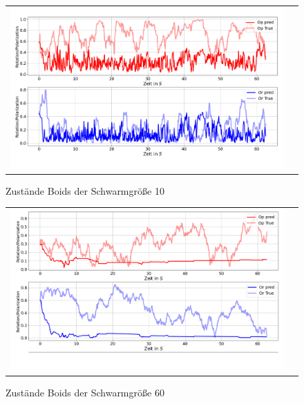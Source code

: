 \begin{appendices}
\begin{figure}[H]
\centering
\begin{tabular}{cc}
\includegraphics[width=1.0\textwidth]{figures/Anhang/Boids_10.png} 
\end{tabular}
\caption{Zustände Boids der Schwarmgröße 10 }
\end{figure}

\begin{figure}[H]
\centering
\begin{tabular}{cc}
\includegraphics[width=1.0\textwidth]{figures/Anhang/Boids_60.png} 
\end{tabular}
\caption{Zustände Boids der Schwarmgröße 60 }
\end{figure}


\end{appendices}
